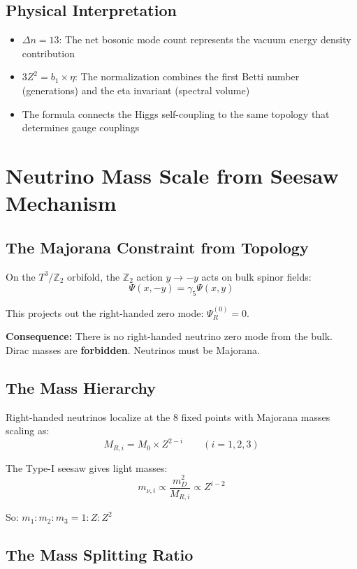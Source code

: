 \documentclass[11pt,a4paper]{article}
\theoremstyle{plain}
\theoremstyle{definition}
\theoremstyle{remark}
\begin{document}
\subsection{Physical Interpretation}

\begin{itemize}
  \item $\Delta n = 13$: The net bosonic mode count represents the vacuum energy density contribution
  \item $3Z^2 = b_1 \times \eta$: The normalization combines the first Betti number (generations) and the eta invariant (spectral volume)
  \item The formula connects the Higgs self-coupling to the same topology that determines gauge couplings
\end{itemize}

\section{Neutrino Mass Scale from Seesaw Mechanism}
\label{sec:neutrino}

\subsection{The Majorana Constraint from Topology}

On the $T^3/\mathbb{Z}_2$ orbifold, the $\mathbb{Z}_2$ action $y \to -y$ acts on bulk spinor fields:
\[
\Psi(x, -y) = \gamma_5 \Psi(x, y)
\]

This projects out the right-handed zero mode: $\Psi_R^{(0)} = 0$.

\textbf{Consequence:} There is no right-handed neutrino zero mode from the bulk. Dirac masses are \textbf{forbidden}. Neutrinos must be Majorana.

\subsection{The Mass Hierarchy}

Right-handed neutrinos localize at the 8 fixed points with Majorana masses scaling as:
\[
M_{R,i} = M_0 \times Z^{2-i} \qquad (i = 1, 2, 3)
\]

The Type-I seesaw gives light masses:
\[
m_{\nu,i} \propto \frac{m_D^2}{M_{R,i}} \propto Z^{i-2}
\]

So: $m_1 : m_2 : m_3 = 1 : Z : Z^2$

\subsection{The Mass Splitting Ratio}
\end{document}
